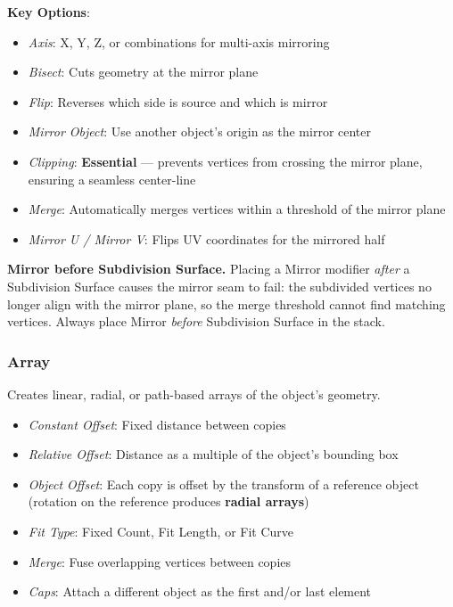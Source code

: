 \textbf{Key Options}:
\begin{itemize}[leftmargin=2em]
  \item \textit{Axis}: X, Y, Z, or combinations for multi-axis mirroring
  \item \textit{Bisect}: Cuts geometry at the mirror plane
  \item \textit{Flip}: Reverses which side is source and which is mirror
  \item \textit{Mirror Object}: Use another object's origin as the mirror center
  \item \textit{Clipping}: \textbf{Essential} --- prevents vertices from crossing the mirror plane, ensuring a seamless center-line
  \item \textit{Merge}: Automatically merges vertices within a threshold of the mirror plane
  \item \textit{Mirror U / Mirror V}: Flips UV coordinates for the mirrored half
\end{itemize}

\begin{warningbox}
\textbf{Mirror before Subdivision Surface.} Placing a Mirror modifier \textit{after} a Subdivision Surface causes the mirror seam to fail: the subdivided vertices no longer align with the mirror plane, so the merge threshold cannot find matching vertices. Always place Mirror \textit{before} Subdivision Surface in the stack.
\end{warningbox}

\subsubsection{Array}
\label{sec:array}

Creates linear, radial, or path-based arrays of the object's geometry.

\begin{itemize}[leftmargin=2em]
  \item \textit{Constant Offset}: Fixed distance between copies
  \item \textit{Relative Offset}: Distance as a multiple of the object's bounding box
  \item \textit{Object Offset}: Each copy is offset by the transform of a reference object (rotation on the reference produces \textbf{radial arrays})
  \item \textit{Fit Type}: Fixed Count, Fit Length, or Fit Curve
  \item \textit{Merge}: Fuse overlapping vertices between copies
  \item \textit{Caps}: Attach a different object as the first and/or last element
\end{itemize}

